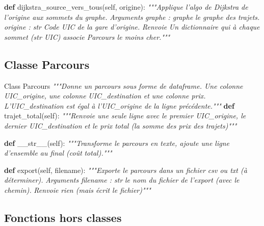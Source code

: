 \documentclass[
]{article}
\newenvironment{Shaded}{\begin{snugshade}}{\end{snugshade}}
\newcommand{\CommentTok}[1]{\textcolor[rgb]{0.56,0.35,0.01}{\textit{#1}}}
\newcommand{\FunctionTok}[1]{\textcolor[rgb]{0.00,0.00,0.00}{#1}}
\newcommand{\KeywordTok}[1]{\textcolor[rgb]{0.13,0.29,0.53}{\textbf{#1}}}
\newcommand{\NormalTok}[1]{#1}
\newcommand{\VariableTok}[1]{\textcolor[rgb]{0.00,0.00,0.00}{#1}}
\begin{document}
\begin{Shaded}
\begin{Highlighting}[]
  \KeywordTok{def}\NormalTok{ dijkstra\_source\_vers\_tous(}\VariableTok{self}\NormalTok{, origine):}
      \CommentTok{"""Applique l’algo de Dijkstra de l’origine aux sommets   du graphe.}
\CommentTok{    Arguments}
\CommentTok{          graphe : graphe}
\CommentTok{            le graphe des trajets.}
\CommentTok{        origine : str}
\CommentTok{            Code UIC de la gare d’origine.}
\CommentTok{    Renvoie}
\CommentTok{        Un dictionnaire qui à chaque sommet (str UIC) associe Parcours le moins cher."""}
\end{Highlighting}
\end{Shaded}

\hypertarget{classe-parcours}{%
\subsection{Classe Parcours}\label{classe-parcours}}

\begin{Shaded}
\begin{Highlighting}[]
\NormalTok{Class Parcours}
    \CommentTok{"""Donne un parcours sous forme de dataframe. Une colonne UIC\_origine, une colonne}
\CommentTok{    UIC\_destination et une colonne prix. L’UIC\_destination est égal à l’UIC\_origine de}
\CommentTok{    la ligne    précédente."""}
  \KeywordTok{def}\NormalTok{ trajet\_total(}\VariableTok{self}\NormalTok{):}
    \CommentTok{"""Renvoie une seule ligne avec le premier UIC\_origine, le dernier UIC\_destination}
\CommentTok{            et le prix total (la somme des prix des trajets)"""}
    
  \KeywordTok{def} \FunctionTok{\_\_str\_\_}\NormalTok{(}\VariableTok{self}\NormalTok{):}
        \CommentTok{"""Transforme le parcours en texte, ajoute une ligne d’ensemble au final (coût}
\CommentTok{        total)."""}
        
  \KeywordTok{def}\NormalTok{ export(}\VariableTok{self}\NormalTok{, filename):}
        \CommentTok{"""Exporte le parcours dans un fichier csv ou txt (à déterminer).}
\CommentTok{        Arguments}
\CommentTok{        filename : str}
\CommentTok{          le nom du fichier de l’export (avec le chemin).}
\CommentTok{        Renvoie}
\CommentTok{          rien (mais écrit le fichier)"""}
\end{Highlighting}
\end{Shaded}

\hypertarget{fonctions-hors-classes}{%
\subsection{Fonctions hors classes}\label{fonctions-hors-classes}}
\end{document}
